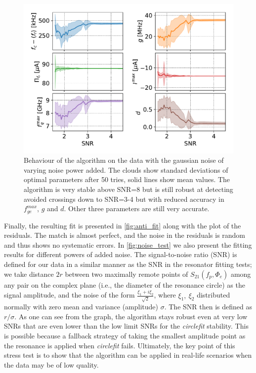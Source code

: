 \documentclass[%
 aip,
 amsmath,amssymb,
 reprint,%
]{revtex4-1}
\begin{document}
\begin{figure}
\centering
\includegraphics[width=\linewidth]{noise_test}
\caption{Behaviour of the algorithm on the data with the gaussian noise of varying noise power added. The clouds show standard deviations of optimal parameters after 50 tries, solid lines show mean values. The algorithm is very stable above SNR=8 but is still robust at detecting avoided crossings down to SNR=3-4 but with reduced accuracy in $f_{ge}^{max}$, $g$ and $d$. Other three parameters are still very accurate.}
\label{fig:noise_test}
\end{figure}

Finally, the resulting fit is presented in \autoref{fig:anti_fit} along with the plot of the residuals. The match is almost perfect, and the noise in the residuals is random and thus shows no systematic errors. In \autoref{fig:noise_test} we also present the fitting results for different powers of added noise. The signal-to-noise ratio (SNR) is defined for our data in a similar manner as the SNR in the resonator fitting tests\cite{probst2015}; we take distance $2r$ between two maximally remote points of $S_{21}(f_p, \Phi_e)$ among any pair on the complex plane (i.e., the diameter of the resonance circle) as the signal amplitude, and the noise of the form $\frac{\xi_1+i\xi_2}{\sqrt 2}$, where $\xi_1,\ \xi_2$ distributed normally with zero mean and variance (amplitude) $\sigma$. The SNR then is defined as $r/\sigma$. As one can see from the graph, the algorithm stays robust even at very low SNRs that are even lower than the low limit SNRs for the \textit{circlefit} stability. This is possible because a fallback strategy of taking the smallest amplitude point as the resonance is applied when \textit{circlefit} fails. Ultimately, the key point of this stress test is to show that the algorithm can be applied in real-life scenarios when the data may be of low quality.
\end{document}
